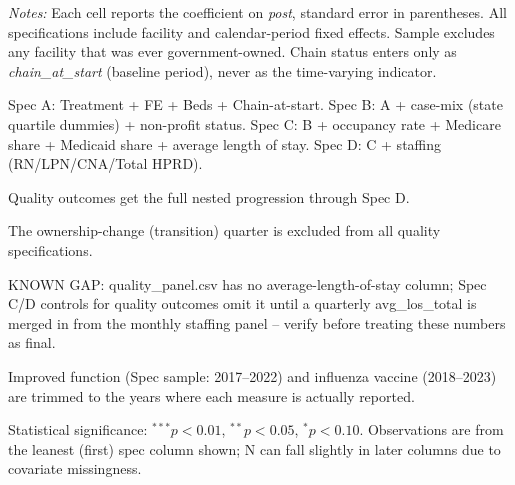 \begin{table}[H]
\begin{threeparttable}
\begin{tablenotes}[flushleft]
\footnotesize
\item \textit{Notes:} Each cell reports the coefficient on \textit{post}, standard error in parentheses. All specifications include facility and calendar-period fixed effects. Sample excludes any facility that was ever government-owned. Chain status enters only as \textit{chain\_at\_start} (baseline period), never as the time-varying indicator.
\item Spec A: Treatment + FE + Beds + Chain-at-start. Spec B: A + case-mix (state quartile dummies) + non-profit status. Spec C: B + occupancy rate + Medicare share + Medicaid share + average length of stay. Spec D: C + staffing (RN/LPN/CNA/Total HPRD).
\item Quality outcomes get the full nested progression through Spec D.
\item The ownership-change (transition) quarter is excluded from all quality specifications.
\item KNOWN GAP: quality\_panel.csv has no average-length-of-stay column; Spec C/D controls for quality outcomes omit it until a quarterly avg\_los\_total is merged in from the monthly staffing panel -- verify before treating these numbers as final.
\item Improved function (Spec sample: 2017--2022) and influenza vaccine (2018--2023) are trimmed to the years where each measure is actually reported.
\item Statistical significance: $^{***}p<0.01$, $^{**}p<0.05$, $^{*}p<0.10$. Observations are from the leanest (first) spec column shown; N can fall slightly in later columns due to covariate missingness.
\end{tablenotes}
\end{threeparttable}
\end{table}

